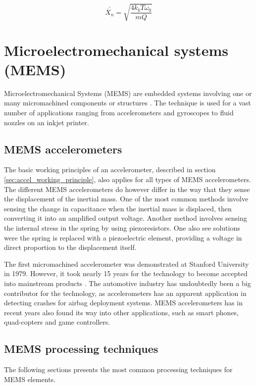\begin{equation}
\bar{\ddot{X_{n}}} = \sqrt{\frac{4 k_b T \omega_0}{mQ}}
\label{eq:noise_spectral_density}
\end{equation}

\section{Microelectromechanical systems (MEMS)}

Microelectromechanical Systems (MEMS) are embedded systems involving one or many micromachined components or structures \cite[p.~3]{maluf04}. The technique is used for a vast number of applications ranging from accelerometers and gyroscopes to fluid nozzles on an inkjet printer.

\subsection{MEMS accelerometers}

The basic working principles of an accelerometer, described in section \ref{sec:accel_working_principle}, also applies for all types of MEMS accelerometers. The different MEMS accelerometers do however differ in the way that they sense the displacement of the inertial mass. One of the most common methods involve sensing the change in capacitance when the inertial mass is displaced, then converting it into an amplified output voltage. Another method involves sensing the internal stress in the spring by using piezoresistors. One also see solutions were the spring is replaced with a piezoelectric element, providing a voltage in direct proportion to the displacement itself.

The first micromachined accelerometer was demonstrated at Stanford University in 1979. However, it took nearly 15 years for the technology to become accepted into mainstream products \cite[p.~8]{maluf04}. The automotive industry has undoubtedly been a big contributor for the technology, as accelerometers has an apparent application in detecting crashes for airbag deployment systems. MEMS accelerometers has in recent years also found its way into other applications, such as smart phones, quad-copters and game controllers. 

\subsection{MEMS processing techniques}

The following sections presents the most common processing techniques for MEMS elements.  

